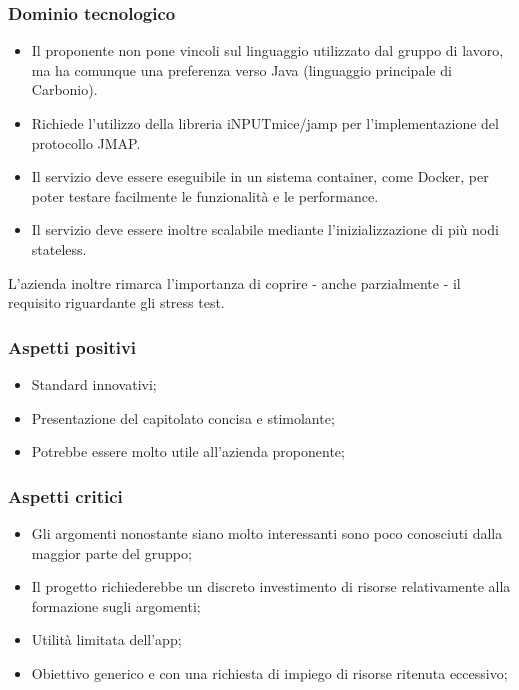 \documentclass[a4paper, 11pt]{article}
\begin{document}
\subsubsection{Dominio tecnologico}
\begin{itemize}
    \item Il proponente non pone vincoli sul linguaggio utilizzato dal gruppo di lavoro, ma ha comunque una preferenza verso Java (linguaggio principale di Carbonio). 
    \item Richiede l'utilizzo della libreria iNPUTmice/jamp per l'implementazione del protocollo JMAP.
    \item Il servizio deve essere eseguibile in un sistema container, come Docker, per poter testare facilmente le funzionalità e le performance.
    \item Il servizio deve essere inoltre scalabile mediante l'inizializzazione di più nodi stateless.
\end{itemize}

L'azienda inoltre rimarca l'importanza di coprire - anche parzialmente - il requisito riguardante gli stress test.

\subsubsection{Aspetti positivi}
\begin{itemize}
    \item Standard innovativi;
    \item Presentazione del capitolato concisa e stimolante;
    \item Potrebbe essere molto utile all’azienda proponente;
\end{itemize}

\pagebreak

\subsubsection{Aspetti critici}
\begin{itemize}
    \item Gli argomenti nonostante siano molto interessanti sono poco conosciuti dalla maggior parte del gruppo;
    \item Il progetto richiederebbe un discreto investimento di risorse relativamente alla formazione sugli argomenti;
    \item Utilità limitata dell'app;
    \item Obiettivo generico e con una richiesta di impiego di risorse ritenuta eccessivo;
\end{itemize}
\end{document}
